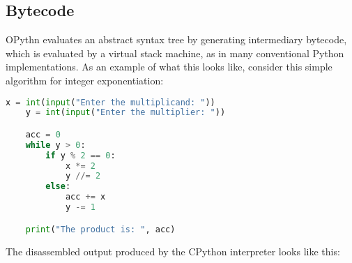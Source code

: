 \documentclass[11pt, twoside]{article}
\begin{document}
    \subsection{Bytecode}
    OPythn evaluates an abstract syntax tree by generating intermediary bytecode, which is evaluated by a virtual stack machine, as in many conventional Python implementations. As an example of what this looks like, consider this simple algorithm for integer exponentiation:
    \begin{lstlisting}[language=python]
    x = int(input("Enter the multiplicand: "))
    y = int(input("Enter the multiplier: "))

    acc = 0
    while y > 0:
        if y % 2 == 0:
            x *= 2
            y //= 2
        else:
            acc += x
            y -= 1

    print("The product is: ", acc)
    \end{lstlisting}
    The disassembled output produced by the CPython interpreter looks like this:
\end{document}
